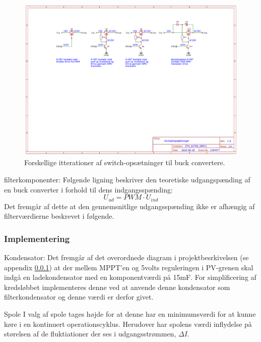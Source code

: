 \documentclass[../main.tex]{subfiles}
\begin{document}
            \begin{figure}[H]
            \includegraphics[width=\textwidth]{Dokumentation/Figures/PV_Converter switches.png}
            \caption{Forskellige itterationer af switch-opsætninger til buck convertere.}
            \label{fig: Switch designs}
            \end{figure}
            
            filterkomponenter:
                Følgende ligning beskriver den teoretiske udgangspænding af en buck converter i forhold til dens indgangsspænding:\newline
                $$U_{ud} = PWM \cdot U_{ind} $$\newline
                Det fremgår af dette at den gennemsnitlige udgangsspænding ikke er afhængig af filterværdierne beskrevet i følgende.
            
        \subsubsection{Implementering}

            Kondensator:
            Det fremgår af det overordnede diagram i projektbesrkivelsen (se appendix \ref{}) at der mellem MPPT'en og 5volts reguleringen i PV-grenen skal indgå en ladekondensator med en komponentværdi på 15mF. For simplificering af kredsløbbet implementeres denne ved at anvende denne kondensator som filterkondensator og denne værdi er derfor givet.
            
            Spole
            I valg af spole tages højde for at denne har en minimumsvørdi for at kunne køre i en kontinuert operationscyklus. Herudover har spolens værdi inflydelse på størelsen af de fluktiationer der ses i udgangsstrømmen, $\Delta I$.\newline
\end{document}

